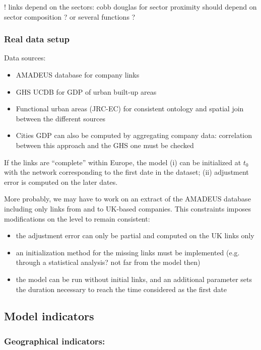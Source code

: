 \documentclass{article}
\begin{document}
! links depend on the sectors: cobb douglas for sector proximity should depend on sector composition ? or several functions ?


\subsubsection{Real data setup}

Data sources:
\begin{itemize}
	\item AMADEUS database for company links
	\item GHS UCDB for GDP of urban built-up areas
	\item Functional urban areas (JRC-EC) for consistent ontology and spatial join between the different sources
	\item Cities GDP can also be computed by aggregating company data: correlation between this approach and the GHS one must be checked
\end{itemize}

If the links are ``complete'' within Europe, the model (i) can be initialized at $t_0$ with the network corresponding to the first date in the dataset; (ii) adjustment error is computed on the later dates.

More probably, we may have to work on an extract of the AMADEUS database including only links from and to UK-based companies. This constraints imposes modifications on the level to remain consistent:
\begin{itemize}
    \item the adjustment error can only be partial and computed on the UK links only
    \item an initialization method for the missing links must be implemented (e.g. through a statistical analysis? not far from the model then)
    \item the model can be run without initial links, and an additional parameter sets the duration necessary to reach the time considered as the first date
\end{itemize}




\subsection{Model indicators}


\subsubsection{Geographical indicators:}
\end{document}
